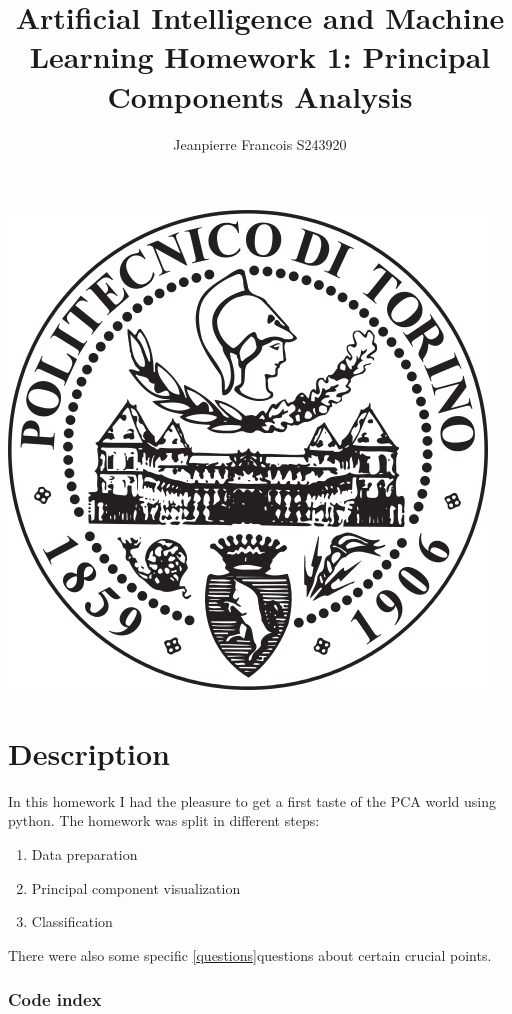 \documentclass[11pt]{article}
\title{%
    Artificial Intelligence and Machine Learning\newline
    \large \newline Homework 1: Principal Components Analysis
    }
\author{Jeanpierre Francois S243920}
\makeatletter
\def\maxwidth{\ifdim\Gin@nat@width>\linewidth\linewidth
    \else\Gin@nat@width\fi}
\let\Oldincludegraphics\includegraphics
\renewcommand{\includegraphics}[1]{\Oldincludegraphics[width=.8\maxwidth]{#1}}
\makeatother
\begin{document}
    \maketitle
    \begin{center}
      \includegraphics{polito_logo.png}
    \end{center}\newpage

\section{Description}\label{description}

In this homework I had the pleasure to get a first taste of the PCA
world using python.\newline
The homework was split in different steps:
\begin{enumerate}
  \item Data preparation
  \item Principal component visualization
  \item Classification
\end{enumerate}
There were also some specific \ref{questions}{questions} about certain
crucial points.

\subsubsection{Code index}\label{code-index}
\end{document}
